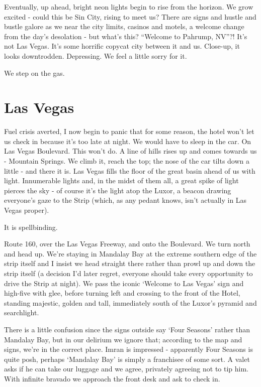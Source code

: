 \documentclass[a5paper,titlepage,11pt]{book}
\begin{document}
Eventually, up ahead, bright neon lights begin to rise from the horizon.  We grow excited - could this be Sin City, rising to meet us?  There are signs and hustle and bustle galore as we near the city limits, casinos and motels, a welcome change from the day's desolation - but what's this?  ``Welcome to Pahrump, NV''?!  It's not Las Vegas.  It's some horrific copycat city between it and us.  Close-up, it looks downtrodden.  Depressing.  We feel a little sorry for it.

We step on the gas.

\section*{Las Vegas}
Fuel crisis averted, I now begin to panic that for some reason, the hotel won't let us check in because it's too late at night.  We would have to sleep in the car.  On Las Vegas Boulevard.  This won't do.  A line of hills rises up and comes towards us - Mountain Springs.  We climb it, reach the top; the nose of the car tilts down a little - and there it is.  Las Vegas fills the floor of the great basin ahead of us with light.  Innumerable lights and, in the midst of them all, a great spike of light pierces the sky - of course it's the light atop the Luxor, a beacon drawing everyone's gaze to the Strip (which, as any pedant knows, isn't actually in Las Vegas proper).

It is spellbinding.

Route 160, over the Las Vegas Freeway, and onto the Boulevard.  We turn north and head up.  We're staying in Mandalay Bay at the extreme southern edge of the strip itself and I insist we head straight there rather than prowl up and down the strip itself (a decision I'd later regret, everyone should take every opportunity to drive the Strip at night).  We pass the iconic `Welcome to Las Vegas' sign and high-five with glee, before turning left and crossing to the front of the Hotel, standing majestic, golden and tall, immediately south of the Luxor's pyramid and searchlight.

There is a little confusion since the signs outside say `Four Seasons' rather than Mandalay Bay, but in our delirium we ignore that; according to the map and signs, we're in the correct place.  Imran is impressed - apparently Four Seasons is quite posh, perhaps `Mandalay Bay' is simply a franchisee of some sort.  A valet asks if he can take our luggage and we agree, privately agreeing not to tip him.  With infinite bravado we approach the front desk and ask to check in.
\end{document}

